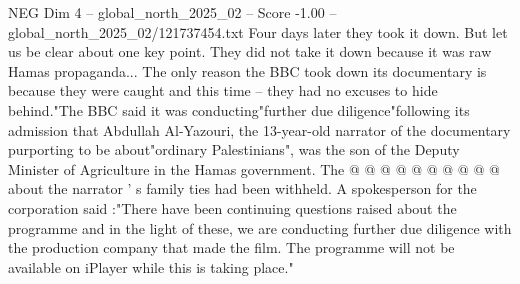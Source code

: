 \begin{textsample}{NEG Dim 4 – global\_north\_2025\_02 – Score -1.00 – global\_north\_2025\_02/121737454.txt}
Four days later they took it down.
But let us be clear about one key point.
They did not take it down because it was raw Hamas propaganda...
The only reason the BBC took down its documentary is because they were caught and this time -- they had no excuses to hide behind."The BBC said it was conducting"further due diligence"following its admission that Abdullah Al-Yazouri, the 13-year-old narrator of the documentary purporting to be about"ordinary Palestinians", was the son of the Deputy Minister of Agriculture in the Hamas government.
The @ @ @ @ @ @ @ @ @ @ about the narrator ' s family ties had been withheld.
A spokesperson for the corporation said :"There have been continuing questions raised about the programme and in the light of these, we are conducting further due diligence with the production company that made the film.
The programme will not be available on iPlayer while this is taking place."

\end{textsample}
